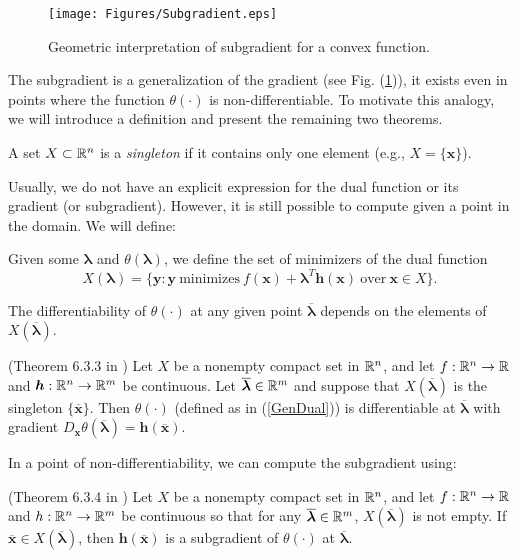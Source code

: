 \begin{figure}[ht!]
\centering
\texttt{[image: Figures/Subgradient.eps]}
\caption{Geometric interpretation of subgradient for a convex function.}
\label{Subgradient}
\end{figure}

The subgradient is a generalization of the gradient (see Fig. (\ref{Subgradient})), 
it exists even in points where the function $\theta(\cdot)$ is non-differentiable. 
To motivate this analogy, we will introduce a definition and present the remaining 
two theorems.

\begin{definition}
A set $X\subset\mathbb{R}^n$ is a \textit{singleton} if it contains only one element 
(e.g., $X=\{\bm{x}\}$).
\end{definition}
Usually, we do not have an explicit expression for the dual function or 
its gradient (or subgradient). However, it is still possible to compute given 
a point in the domain. We will define:
\begin{definition}
Given some $\bm{\lambda}$ and $\theta(\bm{\lambda})$, we define the set of minimizers of the dual function
\begin{equation}
X(\bm{\lambda})=\{\bm{y}:\bm{y}\ \text{minimizes}\ f(\bm{x})+\bm{\lambda}^T\bm{h}(\bm{x})\ \text{over}\ \bm{x}\in X\}.
\end{equation}
\end{definition}

The differentiability of $\theta(\cdot)$ at any given point $\overline{\bm{\lambda}}$ 
depends on the elements of $X(\overline{\bm{\lambda}})$.

\begin{theorem}{(Theorem 6.3.3 in \cite{bazaraa2013nonlinear})} \label{Theorem_Gradient}
Let $X$ be a nonempty compact set in $\mathbb{R}^n$, and let $f:\mathbb{R}^n\to\mathbb{R}$ and 
$\bm{h}:\mathbb{R}^n\to\mathbb{R}^{m}$ be continuous. Let $\overline{\bm{\lambda}}\in\mathbb{R}^{m}$ and 
suppose that $X(\overline{\bm{\lambda}})$ is the singleton $\{\overline{\bm{x}}\}$. 
Then $\theta(\cdot)$ (defined as in (\ref{GenDual})) is differentiable at 
$\overline{\bm{\lambda}}$ with gradient $D_{\bm{x}}\theta(\overline{\bm{\lambda}})=\bm{h}(\overline{\bm{x}})$.
\end{theorem}

In a point of non-differentiability, we can compute the subgradient using:

\begin{theorem}{(Theorem 6.3.4 in \cite{bazaraa2013nonlinear})} \label{Theorem_SubGradient}
Let $X$ be a nonempty compact set in $\mathbb{R}^n$, and let $f:\mathbb{R}^n\to\mathbb{R}$ and 
$h:\mathbb{R}^n\to\mathbb{R}^{m}$ be continuous so that for any 
$\overline{\bm{\lambda}}\in\mathbb{R}^{m}$, $X(\overline{\bm{\lambda}})$ is not empty. 
If $\overline{\bm{x}}\in X(\overline{\bm{\lambda}})$, then $\bm{h}(\overline{\bm{x}})$ 
is a subgradient of $\theta(\cdot)$ at $\overline{\bm{\lambda}}$.
\end{theorem}

